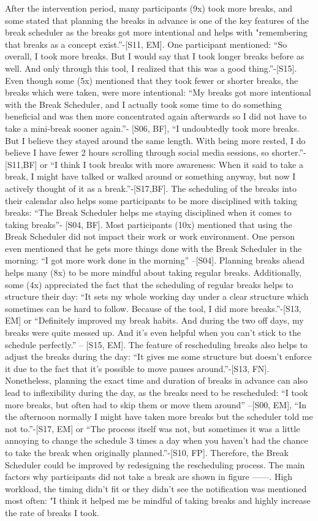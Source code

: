 \documentclass{hasel_thesis}
\begin{document}
After the intervention period, many participants (9x) took more breaks, and some stated that planning the breaks in advance is one of the key features of the break scheduler as the breaks got more intentional and helps with "remembering that breaks as a concept exist.”-[S11, EM]. One participant mentioned: “So overall, I took more breaks. But I would say that I took longer breaks before as well. And only through this tool, I realized that this was a good thing.”-[S15]. Even though some (5x) mentioned that they took fewer or shorter breaks, the breaks which were taken, were more intentional: “My breaks got more intentional with the Break Scheduler, and I actually took some time to do something beneficial and was then more concentrated again afterwards so I did not have to take a mini-break sooner again.”- [S06, BF], “I undoubtedly took more breaks. But I believe they stayed around the same length. With being more rested, I do believe I have fewer 2 hours scrolling through social media sessions, so shorter.”- [S11,BF] or “I think I took breaks with more awareness: When it said to take a break, I might have talked or walked around or something anyway, but now I actively thought of it as a break.”-[S17,BF]. The scheduling of the breaks into their calendar also helps some participants to be more disciplined with taking breaks: “The Break Scheduler helps me staying disciplined when it comes to taking breaks”- [S04, BF]. Most participants (10x) mentioned that using the Break Scheduler did not impact their work or work environment. One person even mentioned that he gets more things done with the Break Scheduler in the morning: “I got more work done in the morning” –[S04]. Planning breaks ahead helps many (8x) to be more mindful about taking regular breaks. Additionally, some (4x) appreciated the fact that the scheduling of regular breaks helps to structure their day: “It sets my whole working day under a clear structure which sometimes can be hard to follow. Because of the tool, I did more breaks.”-[S13, EM] or “Definitely improved my break habits. And during the two off days, my breaks were quite messed up. And it's even helpful when you can't stick to the schedule perfectly.” – [S15, EM]. The feature of rescheduling breaks also helps to adjust the breaks during the day: “It gives me some structure but doesn't enforce it due to the fact that it's possible to move pauses around.”-[S13, FN]. Nonetheless, planning the exact time and duration of breaks in advance can also lead to inflexibility during the day, as the breaks need to be rescheduled: “I took more breaks, but often had to skip them or move them around” –[S00, EM], “In the afternoon normally I might have taken more breaks but the scheduler told me not to.”-[S17, EM] or “The process itself was not, but sometimes it was a little annoying to change the schedule 3 times a day when you haven't had the chance to take the break when originally planned.”-[S10, FP]. Therefore, the Break Scheduler could be improved by redesigning the rescheduling process. The main factors why participants did not take a break are shown in figure ------. High workload, the timing didn't fit or they didn't see the notification was mentioned most often: "I think it helped me be mindful of taking breaks and highly increase the rate of breaks I took. 
\end{document}
